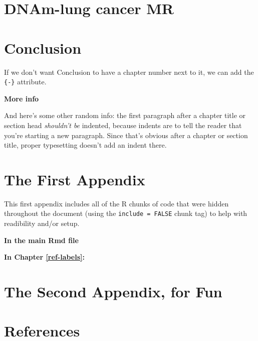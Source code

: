 \documentclass[11pt,twoside]{bristolthesis}
\begin{document}
\hypertarget{dnam-lung-cancer-mr}{%
\chapter{DNAm-lung cancer MR}\label{dnam-lung-cancer-mr}}

\hypertarget{conclusion}{%
\chapter*{Conclusion}\label{conclusion}}

If we don't want Conclusion to have a chapter number next to it, we can add the \texttt{\{-\}} attribute.

\textbf{More info}

And here's some other random info: the first paragraph after a chapter title or section head \emph{shouldn't be} indented, because indents are to tell the reader that you're starting a new paragraph. Since that's obvious after a chapter or section title, proper typesetting doesn't add an indent there.

\appendix

\hypertarget{the-first-appendix}{%
\chapter{The First Appendix}\label{the-first-appendix}}

This first appendix includes all of the R chunks of code that were hidden throughout the document (using the \texttt{include\ =\ FALSE} chunk tag) to help with readibility and/or setup.

\textbf{In the main Rmd file}

\textbf{In Chapter \ref{ref-labels}:}

\hypertarget{the-second-appendix-for-fun}{%
\chapter{The Second Appendix, for Fun}\label{the-second-appendix-for-fun}}

\backmatter

\hypertarget{references}{%
\chapter*{References}\label{references}}

\end{document}
